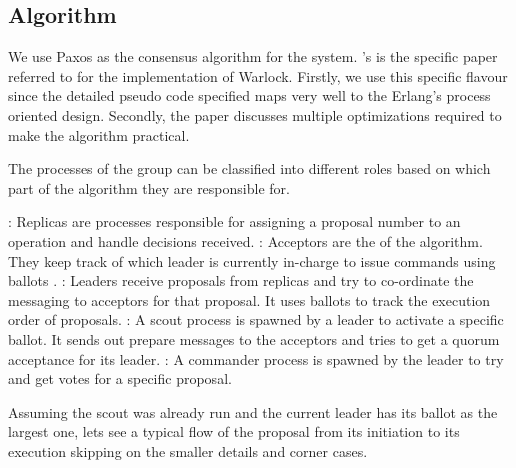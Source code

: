 \subsection{Algorithm}

We use Paxos  as the consensus algorithm for the system.
\citet{Robbert2011}'s  is the specific paper
referred to for the implementation of
Warlock. Firstly, we use this specific flavour since the detailed pseudo code
specified maps very well to the Erlang's process oriented%
 design. Secondly, the paper discusses multiple optimizations required to make
the algorithm practical.

The processes of the group can be classified into different roles based on
which part of the algorithm they are responsible for.

\begin{itemize}
    : Replicas are processes responsible for assigning a proposal
    number to an operation and handle decisions received.
    : Acceptors are the  of the algorithm. They keep
    track of which leader is currently in-charge to issue commands using
    ballots%
    .
    : Leaders receive proposals from replicas and try to
    co-ordinate the messaging to acceptors for that proposal. It uses ballots
    to track the execution order of proposals.
    : A scout process is spawned by a leader to activate a specific
    ballot. It sends out prepare messages to the acceptors and tries to get a
    quorum acceptance for its leader.
    : A commander process is spawned by the leader to try
    and get votes for a specific proposal.
\end{itemize}

Assuming the scout was already run and the current leader has its ballot as the
largest one, lets see a typical flow of the proposal from its initiation to its
execution skipping on the smaller details and corner cases.

